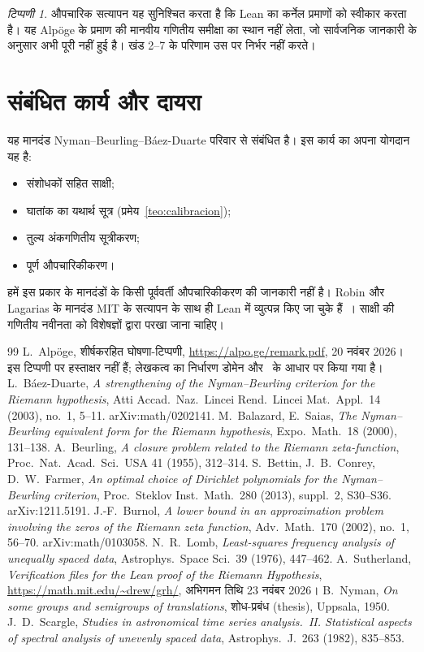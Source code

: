 \documentclass[11pt,a4paper]{amsart}
\theoremstyle{definition}
\theoremstyle{remark}
\newtheorem{observacion}[teorema]{टिप्पणी}
\begin{document}
\begin{observacion}
औपचारिक सत्यापन यह सुनिश्चित करता है कि Lean का कर्नेल प्रमाणों को स्वीकार करता है। यह Alp\"oge के प्रमाण की मानवीय गणितीय समीक्षा का स्थान नहीं लेता, जो सार्वजनिक जानकारी के अनुसार अभी पूरी नहीं हुई है। खंड 2--7 के परिणाम उस पर निर्भर नहीं करते।
\end{observacion}

\section{संबंधित कार्य और दायरा}

यह मानदंड Nyman--Beurling--Báez-Duarte परिवार से संबंधित है। इस कार्य का अपना योगदान यह है:
\begin{itemize}
\item संशोधकों सहित साक्षी;
\item घातांक का यथार्थ सूत्र (प्रमेय~\ref{teo:calibracion});
\item तुल्य अंकगणितीय सूत्रीकरण;
\item पूर्ण औपचारिकीकरण।
\end{itemize}
हमें इस प्रकार के मानदंडों के किसी पूर्ववर्ती औपचारिकीकरण की जानकारी नहीं है। Robin और Lagarias के मानदंड MIT के सत्यापन के साथ ही Lean में व्युत्पन्न किए जा चुके हैं~\cite{MIT}। साक्षी की गणितीय नवीनता को विशेषज्ञों द्वारा परखा जाना चाहिए।

\begin{thebibliography}{99}
 L.~Alp\"oge, शीर्षकरहित घोषणा-टिप्पणी, \url{https://alpo.ge/remark.pdf}, 20 नवंबर 2026। इस टिप्पणी पर हस्ताक्षर नहीं हैं; लेखकत्व का निर्धारण डोमेन और~\cite{MIT} के आधार पर किया गया है।
 L.~B\'aez-Duarte, \emph{A strengthening of the Nyman--Beurling criterion for the Riemann hypothesis}, Atti Accad.\ Naz.\ Lincei Rend.\ Lincei Mat.\ Appl.\ 14 (2003), no.~1, 5--11. arXiv:math/0202141.
 M.~Balazard, E.~Saias, \emph{The Nyman--Beurling equivalent form for the Riemann hypothesis}, Expo.\ Math.\ 18 (2000), 131--138.
 A.~Beurling, \emph{A closure problem related to the Riemann zeta-function}, Proc.\ Nat.\ Acad.\ Sci.\ USA 41 (1955), 312--314.
 S.~Bettin, J.~B.~Conrey, D.~W.~Farmer, \emph{An optimal choice of Dirichlet polynomials for the Nyman--Beurling criterion}, Proc.\ Steklov Inst.\ Math.\ 280 (2013), suppl.~2, S30--S36. arXiv:1211.5191.
 J.-F.~Burnol, \emph{A lower bound in an approximation problem involving the zeros of the Riemann zeta function}, Adv.\ Math.\ 170 (2002), no.~1, 56--70. arXiv:math/0103058.
 N.~R.~Lomb, \emph{Least-squares frequency analysis of unequally spaced data}, Astrophys.\ Space Sci.\ 39 (1976), 447--462.
 A.~Sutherland, \emph{Verification files for the Lean proof of the Riemann Hypothesis}, \url{https://math.mit.edu/~drew/grh/}, अभिगमन तिथि 23 नवंबर 2026।
 B.~Nyman, \emph{On some groups and semigroups of translations}, शोध-प्रबंध (thesis), Uppsala, 1950.
 J.~D.~Scargle, \emph{Studies in astronomical time series analysis.~II. Statistical aspects of spectral analysis of unevenly spaced data}, Astrophys.\ J.\ 263 (1982), 835--853.
\end{thebibliography}
\end{document}
